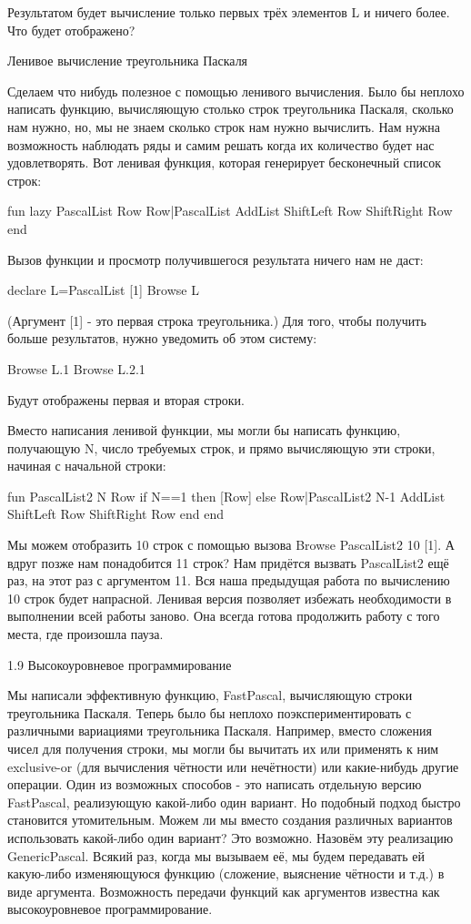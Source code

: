 Результатом будет вычисление только первых трёх элементов L и ничего более. Что будет отображено?

Ленивое вычисление треугольника Паскаля

Сделаем что нибудь полезное с помощью ленивого вычисления. Было бы неплохо написать функцию, вычисляющую столько строк треугольника Паскаля, сколько нам нужно, но, мы не знаем сколько строк нам нужно вычислить. Нам нужна возможность наблюдать ряды и самим решать когда их количество будет нас удовлетворять. Вот ленивая функция, которая генерирует бесконечный список строк:

fun lazy {PascalList Row}
Row|{PascalList
{AddList {ShiftLeft Row}
{ShiftRight Row}}}
end

Вызов функции и просмотр получившегося результата ничего нам не даст:

declare
L={PascalList [1]}
{Browse L}

(Аргумент [1] - это первая строка треугольника.) Для того, чтобы получить больше результатов, нужно уведомить об этом систему:

{Browse L.1}
{Browse L.2.1}

Будут отображены первая и вторая строки.

Вместо написания ленивой функции, мы могли бы написать функцию, получающую N, число требуемых строк, и прямо вычисляющую эти строки, начиная с начальной строки:

fun {PascalList2 N Row}
if N==1 then [Row]
else
Row|{PascalList2 N-1
{AddList {ShiftLeft Row}
{ShiftRight Row}}}
end
end

Мы можем отобразить 10 строк с помощью вызова {Browse {PascalList2 10 [1]}}. А вдруг позже нам понадобится 11 строк? Нам придётся вызвать PascalList2 ещё раз, на этот раз с аргументом 11. Вся наша предыдущая работа по вычислению 10 строк будет напрасной. Ленивая версия позволяет избежать необходимости в выполнении всей работы заново. Она всегда готова продолжить работу с того места, где произошла пауза.

1.9 Высокоуровневое программирование

Мы написали эффективную функцию, FastPascal, вычисляющую строки треугольника Паскаля. Теперь было бы неплохо поэкспериментировать с различными вариациями треугольника Паскаля. Например, вместо сложения чисел для получения строки, мы могли бы вычитать их или применять к ним exclusive-or (для вычисления чётности или нечётности) или какие-нибудь другие операции. Один из возможных способов - это написать отдельную версию FastPascal, реализующую какой-либо один вариант. Но подобный подход быстро становится утомительным. Можем ли мы вместо создания различных вариантов использовать какой-либо один вариант? Это возможно. Назовём эту реализацию GenericPascal. Всякий раз, когда мы вызываем её, мы будем передавать ей какую-либо изменяющуюся функцию (сложение, выяснение чётности и т.д.) в виде аргумента. Возможность передачи функций как аргументов известна как высокоуровневое программирование.

